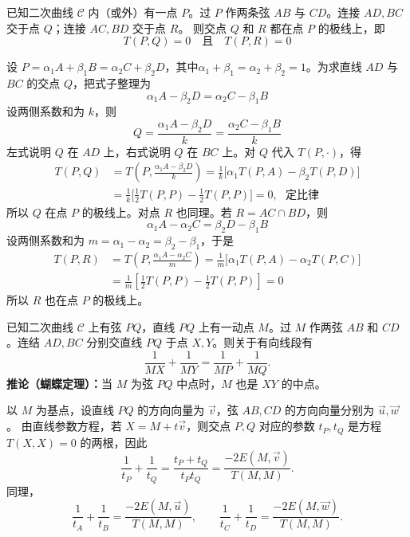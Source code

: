 \begin{conclusion}[完全四边形极点极线定理]
已知二次曲线 $\mathcal{C}$ 内（或外）有一点 $P$。过 $P$ 作两条弦 $AB$ 与 $CD$。连接 $AD, BC$ 交于点 $Q$；连接 $AC, BD$ 交于点 $R$。
则交点 $Q$ 和 $R$ 都在点 $P$ 的极线上，即
$$ T(P, Q) = 0 \quad \text{且} \quad T(P, R) = 0 $$
\end{conclusion}
设 $P = \alpha_1 A + \beta_1 B = \alpha_2 C + \beta_2 D$，其中$\alpha_1+\beta_1 = \alpha_2+\beta_2 = 1$。为求直线 $AD$ 与 $BC$ 的交点 $Q$，把式子整理为
$$ \alpha_1 A - \beta_2 D = \alpha_2 C - \beta_1 B $$
设两侧系数和为 $k$，则
$$ Q = \frac{\alpha_1 A - \beta_2 D}{k} = \frac{\alpha_2 C - \beta_1 B}{k} $$
左式说明 $Q$ 在 $AD$ 上，右式说明 $Q$ 在 $BC$ 上。对 $Q$ 代入 $T(P,\cdot)$，得
\begin{align*}
T(P,Q) &= T\left(P, \frac{\alpha_1 A - \beta_2 D}{k}\right) = \frac{1}{k} \big[ \alpha_1 T(P,A) - \beta_2 T(P,D) \big]\\
&= \frac{1}{k} \big[\frac12T(P,P)-\frac12 T(P,P) \big]=0,~~~\text{定比律}
\end{align*}
所以 $Q$ 在点 $P$ 的极线上。对点 $R$ 也同理。若 $R=AC\cap BD$，则
$$ \alpha_1 A - \alpha_2 C = \beta_2 D - \beta_1 B $$
设两侧系数和为 $m = \alpha_1 - \alpha_2 = \beta_2 - \beta_1$，于是
\begin{align*}
T(P,R) &= T\left(P, \frac{\alpha_1 A - \alpha_2 C}{m}\right) = \frac{1}{m} \big[ \alpha_1 T(P,A) - \alpha_2 T(P,C) \big] \\
&= \frac{1}{m} \left[ \frac{1}{2} T(P,P) - \frac{1}{2} T(P,P) \right] = 0
\end{align*}
所以 $R$ 也在点 $P$ 的极线上。

\begin{conclusion}
    已知二次曲线 $\mathcal{C}$ 上有弦 $PQ$，直线 $PQ$ 上有一动点 $M$。过 $M$ 作两弦 $AB$ 和 $CD$。连结 $AD, BC$ 分别交直线 $PQ$ 于点 $X, Y$。则关于有向线段有
    $$ \frac{1}{MX} + \frac{1}{MY} = \frac{1}{MP} + \frac{1}{MQ}. $$
    \textbf{推论（蝴蝶定理）：}当 $M$ 为弦 $PQ$ 中点时，$M$ 也是 $XY$ 的中点。
\end{conclusion}
以 $M$ 为基点，设直线 $PQ$ 的方向向量为 $\vec{v}$，弦 $AB, CD$ 的方向向量分别为 $\vec{u}, \vec{w}$。
由直线参数方程，若 $X = M + t\vec{v}$，则交点 $P, Q$ 对应的参数 $t_P, t_Q$ 是方程 $T(X,X)=0$ 的两根，因此
\[
\frac{1}{t_P} + \frac{1}{t_Q} = \frac{t_P+t_Q}{t_Pt_Q} = \frac{-2E(M, \vec{v})}{T(M,M)}.
\]
同理，
\[
\frac{1}{t_A} + \frac{1}{t_B} = \frac{-2E(M, \vec{u})}{T(M,M)}, \qquad \frac{1}{t_C} + \frac{1}{t_D} = \frac{-2E(M, \vec{w})}{T(M,M)}.
\]

